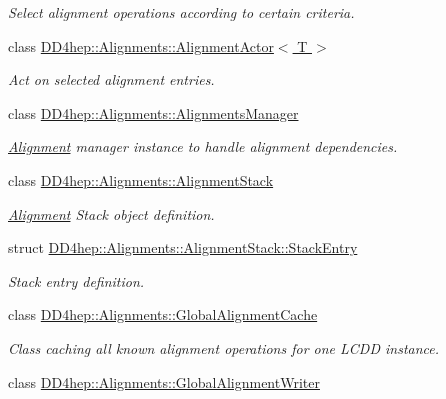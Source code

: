 \begin{DoxyCompactItemize}
\begin{DoxyCompactList}\small\item\em Select alignment operations according to certain criteria. \item\end{DoxyCompactList}\item 
class \hyperlink{class_d_d4hep_1_1_alignments_1_1_alignment_actor}{DD4hep::Alignments::AlignmentActor$<$ T $>$}
\begin{DoxyCompactList}\small\item\em Act on selected alignment entries. \item\end{DoxyCompactList}\item 
class \hyperlink{class_d_d4hep_1_1_alignments_1_1_alignments_manager}{DD4hep::Alignments::AlignmentsManager}
\begin{DoxyCompactList}\small\item\em \hyperlink{class_d_d4hep_1_1_alignments_1_1_alignment}{Alignment} manager instance to handle alignment dependencies. \item\end{DoxyCompactList}\item 
class \hyperlink{class_d_d4hep_1_1_alignments_1_1_alignment_stack}{DD4hep::Alignments::AlignmentStack}
\begin{DoxyCompactList}\small\item\em \hyperlink{class_d_d4hep_1_1_alignments_1_1_alignment}{Alignment} Stack object definition. \item\end{DoxyCompactList}\item 
struct \hyperlink{struct_d_d4hep_1_1_alignments_1_1_alignment_stack_1_1_stack_entry}{DD4hep::Alignments::AlignmentStack::StackEntry}
\begin{DoxyCompactList}\small\item\em Stack entry definition. \item\end{DoxyCompactList}\item 
class \hyperlink{class_d_d4hep_1_1_alignments_1_1_global_alignment_cache}{DD4hep::Alignments::GlobalAlignmentCache}
\begin{DoxyCompactList}\small\item\em Class caching all known alignment operations for one LCDD instance. \item\end{DoxyCompactList}\item 
class \hyperlink{class_d_d4hep_1_1_alignments_1_1_global_alignment_writer}{DD4hep::Alignments::GlobalAlignmentWriter}

\end{DoxyCompactItemize}
